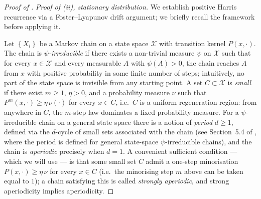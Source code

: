 \documentclass{article}
\newcommand{\Set}[1]{\left\{ #1 \right\}}
\newcommand{\mcX}{\mathcal{X}}
\begin{document}
\begin{proof}[Proof of ]
  \emph{Proof of (ii), stationary distribution.} We establish positive Harris recurrence via a Foster--Lyapunov drift argument; we briefly recall the framework before applying it.

  Let $\Set{X_i}$ be a Markov chain on a state space $\mcX$ with transition kernel $P(x, \cdot)$. The chain is \emph{$\psi$-irreducible} if there exists a non-trivial measure $\psi$ on $\mcX$ such that for every $x \in \mcX$ and every measurable $A$ with $\psi(A) > 0$, the chain reaches $A$ from $x$ with positive probability in some finite number of steps; intuitively, no part of the state space is invisible from any starting point. A set $C \subset \mcX$ is \emph{small} if there exist $m \ge 1$, $\eta > 0$, and a probability measure $\nu$ such that $P^m(x, \cdot) \ge \eta\,\nu(\cdot)$ for every $x \in C$, i.e.\ $C$ is a uniform regeneration region: from anywhere in $C$, the $m$-step law dominates a fixed probability measure. For a $\psi$-irreducible chain on a general state space there is a notion of \emph{period} $d \ge 1$, defined via the $d$-cycle of small sets associated with the chain (see Section~5.4 of \cite{meyn1993markov}, where the period is defined for general state-space $\psi$-irreducible chains), and the chain is \emph{aperiodic} precisely when $d = 1$. A convenient sufficient condition --- which we will use --- is that some small set $C$ admit a one-step minorisation $P(x, \cdot) \ge \eta\,\nu$ for every $x \in C$ (i.e.\ the minorising step $m$ above can be taken equal to $1$); a chain satisfying this is called \emph{strongly aperiodic}, and strong aperiodicity implies aperiodicity.


\end{proof}
\end{document}
